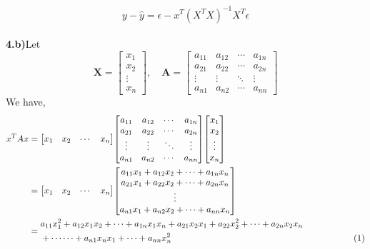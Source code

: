 \documentclass[17pt]{article}
\begin{document}
$$y - \hat{y} = \epsilon - x^T(X^TX)^{-1}X^T\epsilon$$\\
\textbf{4.b)}Let
   $${\mathbf {X}}={\begin{bmatrix}x_{1}\\x_{2}\\\vdots \\x_{n}\end{bmatrix}},
   \quad  \mathbf{A}= {\begin{bmatrix}
   		a_{11}&a_{12}&\cdots &a_{1n}\\
   		a_{21}&a_{22}&\cdots &a_{2n}\\
   		\vdots &\vdots &\ddots &\vdots\\
   		a_{n1}&a_{n2}&\cdots &a_{nn}					\end{bmatrix}}
	$$
We have,
\begin{equation*}
\begin{split}
x^TAx &= { {\begin{bmatrix}x_{1}&x_{2}&\cdots&x_{n}\end{bmatrix}}
	{\begin{bmatrix}
   		a_{11} &a_{12} &\cdots &a_{1n}\\
   		a_{21} &a_{22} &\cdots &a_{2n}\\
   		\vdots &\vdots &\ddots &\vdots\\
   		a_{n1} &a_{n2} &\cdots &a_{nn}
   	\end{bmatrix}}
	{\begin{bmatrix}x_{1}\\x_{2}\\\vdots\\x_{n}\end{bmatrix}}
}
  \\
	 &= { {\begin{bmatrix}x_{1}&x_{2}&\cdots&x_{n}\end{bmatrix}}
	{\begin{bmatrix}
   		a_{11}x_{1} + a_{12}x_{2} + \cdots + a_{1n}x_{n}\\
   		a_{21}x_{1} + a_{22}x_{2} + \cdots + a_{2n}x_{n}\\
   		\vdots\\
   		a_{n1}x_{1} + a_{n2}x_{2} + \cdots + a_{nn}x_{n}
   	\end{bmatrix}}
} \\
	 &= {\begin{split}	 
			& a_{11}x_{1}^2 + a_{12}x_{1}x_{2} +\cdots + a_{1n}x_{1}x_{n} +a_{21}x_{2}x_{1}+a_{22}x_{2}^2+\cdots + a_{2n}x_{2}x_{n}\\
			& +\cdots\cdots+a_{n1}x_{n	}x_{1}+\cdots+a_{nn}x_{n}^2 \hspace{7.25cm}(1)  
	 	\end{split}
}
   \\
\end{split}
\end{equation*}\\
\end{document}
